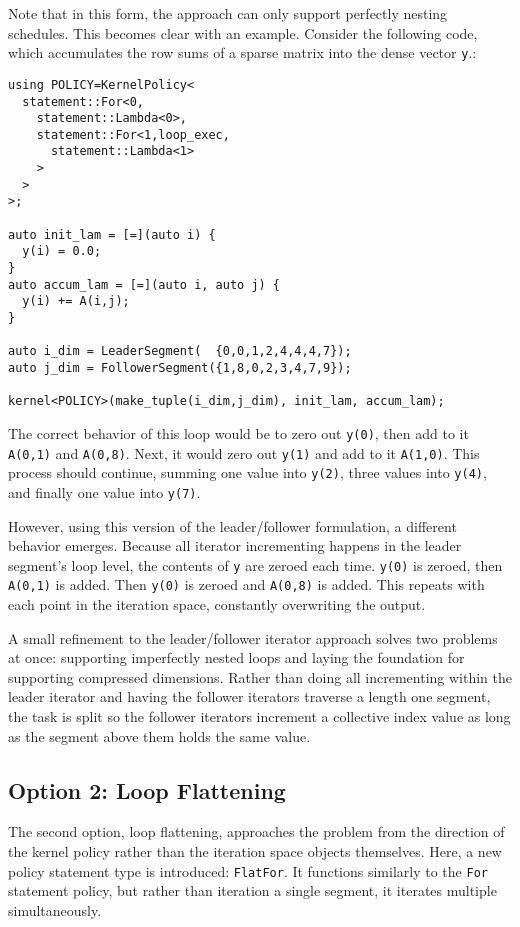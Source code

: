 Note that in this form, the approach can only support perfectly nesting schedules.
This becomes clear with an example.
Consider the following code, which accumulates the row sums of a sparse matrix into the dense vector \verb.y..:
\begin{lstlisting}
using POLICY=KernelPolicy<
  statement::For<0,
    statement::Lambda<0>,
    statement::For<1,loop_exec,
      statement::Lambda<1>
    >
  >
>;

auto init_lam = [=](auto i) {
  y(i) = 0.0;
}
auto accum_lam = [=](auto i, auto j) {
  y(i) += A(i,j);
}

auto i_dim = LeaderSegment(  {0,0,1,2,4,4,4,7});
auto j_dim = FollowerSegment({1,8,0,2,3,4,7,9});

kernel<POLICY>(make_tuple(i_dim,j_dim), init_lam, accum_lam);
\end{lstlisting}
The correct behavior of this loop would be to zero out \verb.y(0)., then add to it \verb.A(0,1). and \verb.A(0,8)..
Next, it would zero out \verb.y(1). and add to it \verb.A(1,0)..
This process should continue, summing one value into \verb.y(2)., three values into \verb.y(4)., and finally one value into \verb.y(7)..

However, using this version of the leader/follower formulation, a different behavior emerges.
Because all iterator incrementing happens in the leader segment's loop level, the contents of \verb.y. are zeroed each time.
\verb.y(0). is zeroed, then \verb.A(0,1). is added.
Then \verb.y(0). is zeroed and \verb.A(0,8). is added.
This repeats with each point in the iteration space, constantly overwriting the output.

A small refinement to the leader/follower iterator approach solves two problems at once: supporting imperfectly nested loops and laying the foundation for supporting compressed dimensions.
Rather than doing all incrementing within the leader iterator and having the follower iterators traverse a length one segment, the task is split so the follower iterators increment a collective index value as long as the segment above them holds the same value.

\subsection{Option 2: Loop Flattening}

The second option, loop flattening, approaches the problem from the direction of the kernel policy rather than the iteration space objects themselves.
Here, a new policy statement type is introduced: \verb.FlatFor.. 
It functions similarly to the \verb.For. statement policy, but rather than iteration a single segment, it iterates multiple simultaneously. 


